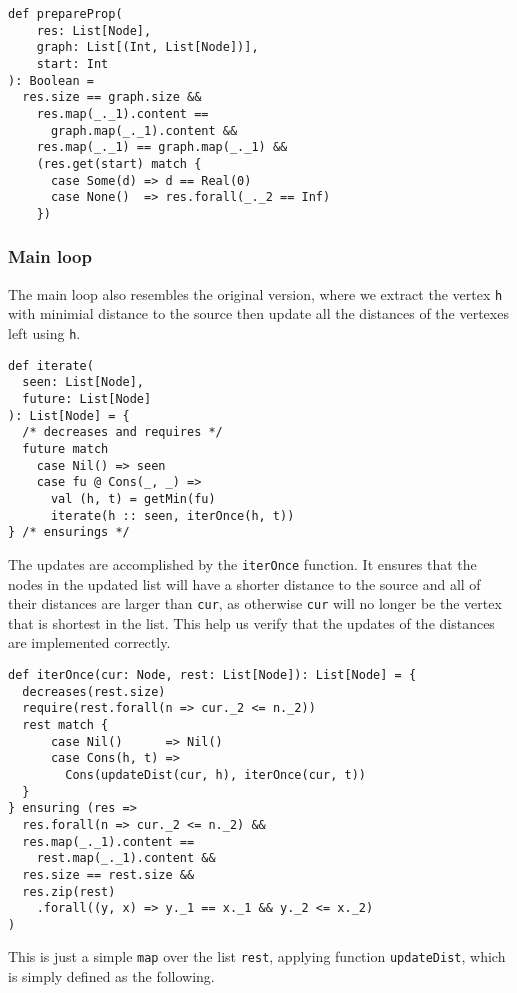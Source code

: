 \documentclass[11pt,a4paper]{article}
\begin{document}
\begin{lstlisting}
def prepareProp(
    res: List[Node],
    graph: List[(Int, List[Node])],
    start: Int
): Boolean =
  res.size == graph.size &&
    res.map(_._1).content == 
      graph.map(_._1).content &&
    res.map(_._1) == graph.map(_._1) &&
    (res.get(start) match {
      case Some(d) => d == Real(0)
      case None()  => res.forall(_._2 == Inf)
    })
\end{lstlisting}

\subsubsection{Main loop}

The main loop also resembles the original version, where we extract the vertex \texttt{h} with
minimial distance to the source then update all the distances of the vertexes left
using \texttt{h}. 

\begin{lstlisting}
def iterate(
  seen: List[Node], 
  future: List[Node]
): List[Node] = {
  /* decreases and requires */
  future match
    case Nil() => seen
    case fu @ Cons(_, _) =>
      val (h, t) = getMin(fu)
      iterate(h :: seen, iterOnce(h, t))
} /* ensurings */
\end{lstlisting}

The updates are accomplished by the \texttt{iterOnce} function. It ensures
that the nodes in the updated list will have a shorter distance to the source
and all of their distances are larger than \texttt{cur}, as otherwise \texttt{cur} 
will no longer be the vertex that is shortest in the list. This help us verify
that the updates of the distances are implemented correctly.

\begin{lstlisting}
def iterOnce(cur: Node, rest: List[Node]): List[Node] = {
  decreases(rest.size)
  require(rest.forall(n => cur._2 <= n._2))
  rest match {
      case Nil()      => Nil()
      case Cons(h, t) => 
        Cons(updateDist(cur, h), iterOnce(cur, t))
  }
} ensuring (res =>
  res.forall(n => cur._2 <= n._2) &&
  res.map(_._1).content == 
    rest.map(_._1).content &&
  res.size == rest.size &&
  res.zip(rest)
    .forall((y, x) => y._1 == x._1 && y._2 <= x._2)
)
\end{lstlisting}

This is just a simple \texttt{map} over the list \texttt{rest}, applying
function \texttt{updateDist}, which is simply defined as the following.
\end{document}
